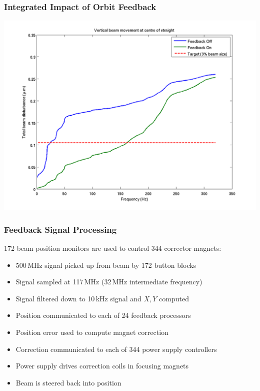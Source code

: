 \documentclass{beamer}
\begin{document}
%
\begin{frame}\frametitle{Integrated Impact of Orbit Feedback}
\includegraphics[width=\linewidth]{fb-on-off-integ}
\end{frame}


%
\begin{frame}\frametitle{Feedback Signal Processing}

172 beam position monitors are used to control 344 corrector magnets:

\begin{itemize}
\item 500\,MHz signal picked up from beam by 172 button blocks
\item Signal sampled at 117\,MHz (32\,MHz intermediate frequency)
\item Signal filtered down to 10\,kHz signal and $X,Y$ computed
\item Position communicated to each of 24 feedback processors
\item Position error used to compute magnet correction
\item Correction communicated to each of 344 power supply controllers
\item Power supply drives correction coils in focusing magnets
\item Beam is steered back into position
\end{itemize}

\end{frame}
\end{document}
